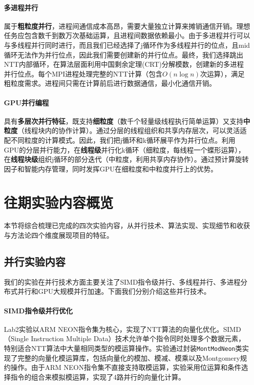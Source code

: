 \documentclass[a4paper]{article}
\begin{document}
\paragraph{多进程并行} 
属于\textbf{粗粒度并行}，进程间通信成本高昂，需要大量独立计算来摊销通信开销。理想任务应包含数千到数万次基础运算，且进程间数据依赖最小。由于多进程并行可以与多线程并行同时进行，而且我们已经选择了j循环作为多线程并行的位点，且mid循环无法作为并行位点，因此我们需要创建新的并行位点。最终，我们选择跳出NTT内部循环，在算法层面利用中国剩余定理(CRT)分解模数，创建新的多进程并行位点。每个MPI进程处理完整的NTT计算（包含$O(n\log n)$次运算），满足粗粒度需求。进程间只需在计算前后进行数据通信，最小化通信开销。

\paragraph{GPU并行编程} 
具有\textbf{多层次并行特征}，既支持\textbf{细粒度}（数千个轻量级线程执行简单运算）又支持\textbf{中粒度}（线程块内的协作计算）。通过分层的线程组织和共享内存层次，可以灵活适配不同粒度的计算模式。因此，我们把j循环和k循环展平作为并行位点。利用GPU的分层并行能力，在\textbf{线程级}并行化k循环（细粒度，每线程一个蝶形运算），在\textbf{线程块级}组织j循环的部分迭代（中粒度，利用共享内存协作）。通过预计算旋转因子和智能内存管理，同时发挥GPU在细粒度和中粒度并行上的优势。

\section{往期实验内容概览}

本节将综合梳理已完成的四次实验内容，从并行技术、算法实现、实现细节和收获与方法论四个维度展现项目的特征。

\subsection{并行实验内容}

我们的实验在并行技术方面主要关注了SIMD指令级并行、多线程并行、多进程分布式并行和GPU大规模并行加速。下面我们分别介绍这些并行技术。

\paragraph{SIMD指令级并行优化} Lab2实验以ARM NEON指令集为核心，实现了NTT算法的向量化优化。SIMD（Single Instruction Multiple Data）技术允许单个指令同时处理多个数据元素，特别适合NTT算法中大量相同类型的模运算操作。实验通过封装\texttt{MontModNeon}类实现了完整的向量化模运算库，包括向量化的模加、模减、模乘以及Montgomery规约操作。由于ARM NEON指令集不直接支持取模运算，实验采用位运算和条件选择指令的组合来模拟模运算，实现了4路并行的向量化计算。
\end{document}
